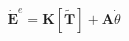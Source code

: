 \documentclass[preview]{standalone}
\begin{document}
\begin{align*}
\dot{\mathbf{E}}^e = \mathbf{K}[\tilde{\mathbf{T}}] + \mathbf{A} \dot{\theta}
\end{align*}
\end{document}
